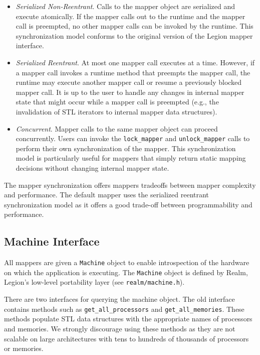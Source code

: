 \begin{itemize}
\item {\em Serialized Non-Reentrant}. Calls to the
      mapper object are serialized and execute atomically. If the mapper 
      calls out to the runtime and the mapper call is preempted, 
      no other mapper calls can be invoked by the runtime.
      This synchronization model conforms to the original version of
      the Legion mapper interface.
\item {\em Serialized Reentrant}. At most one mapper call
      executes at a time. However, if a mapper call invokes a runtime
      method that preempts the mapper call, the runtime may
      execute another mapper call or resume a previously blocked
      mapper call. It is up to the user to handle any changes in internal mapper
      state that might occur while a mapper call is preempted (e.g., the
      invalidation of STL iterators to internal mapper data structures).
\item {\em Concurrent}. Mapper calls to the same mapper object can
      proceed concurrently. Users can invoke the {\tt lock\_mapper} and
      {\tt unlock\_mapper} calls to perform their own synchronization
      of the mapper. This synchronization model is particularly useful for
      mappers that simply return static mapping decisions
      without changing internal mapper state.
\end{itemize}

The mapper synchronization offers mappers tradeoffs between mapper complexity and performance. The default mapper uses the 
serialized reentrant synchronization model as it offers a good trade-off
between programmability and performance.

\subsection{Machine Interface}
\label{subsec:mapping:machine}

All mappers are given a {\tt Machine} object to enable
introspection of the hardware on which the application is executing. The
{\tt Machine} object is defined by Realm, Legion's low-level portability layer (see {\tt realm/machine.h}).

There are two interfaces for querying the machine
object. The old interface contains methods such as {\tt get\_all\_processors}
and {\tt get\_all\_memories}. These methods populate STL data structures
with the appropriate names of processors and memories. We strongly
discourage using these methods as they are not scalable on large
architectures with tens to hundreds of thousands of processors or memories.

